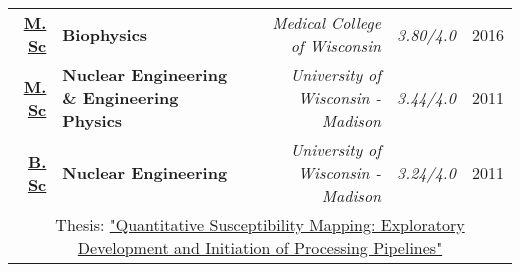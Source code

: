

\begin{minipage}{\textwidth}
	\begin{tabular}{rlrrl}
		\href{https://app.box.com/s/62ffckadt53x8k93p9gp6ylbpqj9vscw}{\textbf{M. Sc}} & \textbf{Biophysics} & \emph{Medical College of Wisconsin} & 
		\textit{ 3.80/4.0} & 2016 \\
		\href{https://app.box.com/s/yyxi60lex92ovm7dus1d5xu9xshdqd91}{\textbf{M. Sc}} & \textbf{Nuclear Engineering \& Engineering Physics} & \emph{University of Wisconsin - Madison} &  \textit{ 3.44/4.0} & 2011 \\
		\href{https://app.box.com/s/yyxi60lex92ovm7dus1d5xu9xshdqd91}{\textbf{B. Sc}} & \textbf{Nuclear Engineering} & \emph{University of Wisconsin - Madison} & \textit{ 3.24/4.0} & 2011 \\
		\multicolumn{5}{c}{Thesis: \href{https://app.box.com/s/o8kksc6n51qpjzc3clfa127xtdfkayzd}{\normalsize"Quantitative Susceptibility Mapping: Exploratory Development and Initiation of Processing Pipelines"}} \\
	\end{tabular}
\end{minipage}

%

%
%

